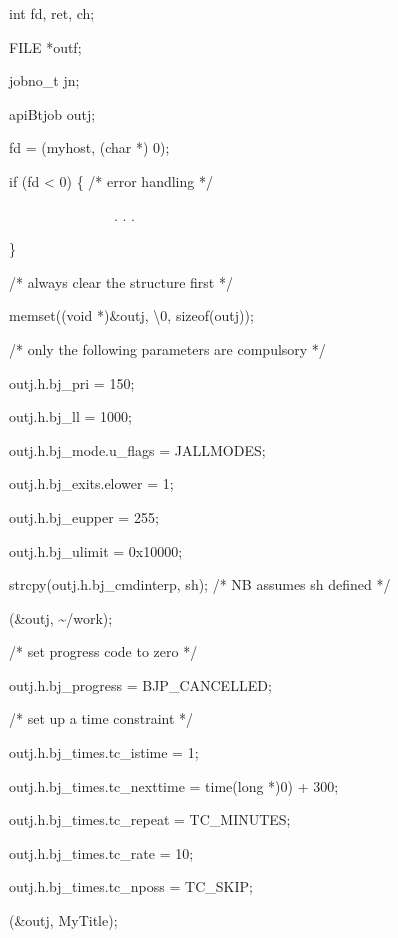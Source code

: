 \begin{expara}

int fd, ret, ch;

FILE *outf;

jobno\_t jn;

apiBtjob outj;

\bigskip


fd = \funcnameXBopen{}({\textquotedbl}myhost{\textquotedbl}, (char *) 0);

if (fd {\textless} 0) \{ /* error handling */

\ \ \ \ \ \ \ \ \ \ \ \ \ \ \ . . .

\}

\bigskip


/* always clear the structure first */

memset((void *)\&outj,
{\textquotesingle}{\textbackslash}0{\textquotesingle}, sizeof(outj));

\bigskip


/* only the following parameters are compulsory */

\bigskip


outj.h.bj\_pri = 150;

outj.h.bj\_ll = 1000;

outj.h.bj\_mode.u\_flags = JALLMODES;

outj.h.bj\_exits.elower = 1;

outj.h.bj\_eupper = 255;

outj.h.bj\_ulimit = 0x10000;

strcpy(outj.h.bj\_cmdinterp, {\textquotedbl}sh{\textquotedbl}); /* NB
assumes sh defined */

\funcnameXBputdirec{}(\&outj, {\textquotedbl}\~{}/work{\textquotedbl});

\bigskip


/* set progress code to zero */

outj.h.bj\_progress = BJP\_CANCELLED;

\bigskip


/* set up a time constraint */

outj.h.bj\_times.tc\_istime = 1;

outj.h.bj\_times.tc\_nexttime = time(long *)0) + 300;

outj.h.bj\_times.tc\_repeat = TC\_MINUTES;

outj.h.bj\_times.tc\_rate = 10;

outj.h.bj\_times.tc\_nposs = TC\_SKIP;

\bigskip


\funcnameXBputtitle{}(\&outj, {\textquotedbl}MyTitle{\textquotedbl});


\end{expara}
